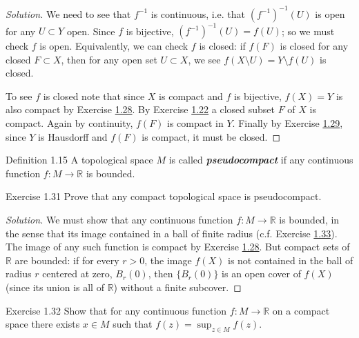 \begin{proof}[Solution]\leavevmode
We need to see that $f^{-1}$ is continuous, i.e. that $(f^{-1})^{-1}(U)$ is open for any $U \subset Y$ open. Since $f$ is bijective,  $(f^{-1})^{-1}(U)=f(U)$; so we must check $f$ is open. Equivalently, we can check $f$ is closed:  if $f(F)$ is closed for any closed $F \subset X$, then for any open set $U\subset X$, we see $f(X\setminus U)=Y\setminus f(U)$ is closed.

To see $f$ is closed note that since $X$ is compact and  $f$ is bijective, $f(X)=Y$ is also compact by  Exercise \hyperref[exer:1.28]{1.28}. By Exercise \hyperref[exer:1.22]{1.22} a closed subset $F$ of $X$ is compact. Again by continuity, $f(F)$ is compact in  $Y$. Finally by Exercise \hyperref[exer:1.29]{1.29}, since $Y$ is Hausdorff and $f(F)$ is compact, it must be closed.
\end{proof}

\begin{thing3}{Definition 1.15}\leavevmode
	A topological space $M$ is called \textit{\textbf{pseudocompact}} if any continuous function $f:M\to \mathbb{R}$ is bounded.
\end{thing3}

\begin{thing4}{Exercise 1.31}\label{exer:1.31}\leavevmode
Prove that any compact topological space is pseudocompact.
\end{thing4}

\begin{proof}[Solution]\leavevmode
We must show that any continuous function $f:M \to \mathbb{R}$ is bounded, in the sense that its image contained in a ball of finite radius (c.f. Exercise \hyperref[exer:1.33]{1.33}). The image of any such function is compact by Exercise \hyperref[exer:1.28]{1.28}. But compact sets of $\mathbb{R}$ are bounded: if for every $r>0$, the image  $f(X)$ is not contained in the ball of radius $r$ centered at zero, $B_r(0)$, then $\{B_r(0)\}$ is an open cover of $f(X)$ (since its union is all of  $\mathbb{R}$) without a finite subcover.
\end{proof}

\begin{thing4}{Exercise 1.32}\label{exer:1.32}\leavevmode
Show that for any continuous function $f:M\longrightarrow \mathbb{R}$ on a compact space there exists $x \in M$ such that  $f(z)=\operatorname{sup}_{z \in  M} f(z)$.
\end{thing4}


